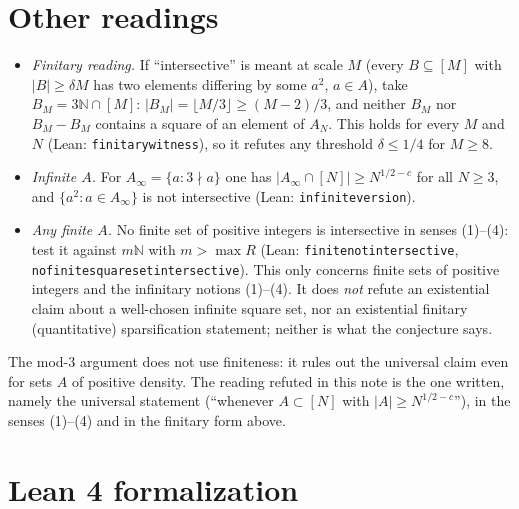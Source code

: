 \documentclass[11pt]{article}
\theoremstyle{definition}
\theoremstyle{remark}
\renewcommand{\_}{\oldus\allowbreak}
\newcommand{\N}{\mathbb{N}}
\begin{document}
\section{Other readings}

\begin{itemize}
  \item \emph{Finitary reading.} If ``intersective'' is meant at scale $M$ (every $B\subseteq[M]$ with
        $|B|\ge\delta M$ has two elements differing by some $a^2$, $a\in A$), take $B_M=3\N\cap[M]$:
        $|B_M|=\lfloor M/3\rfloor\ge(M-2)/3$, and neither $B_M$ nor $B_M-B_M$ contains a square of an element
        of $A_N$. This holds for every $M$ and $N$ (Lean: \texttt{finitary\_witness}), so it refutes any
        threshold $\delta\le1/4$ for $M\ge8$.
  \item \emph{Infinite $A$.} For $A_\infty=\{a:3\nmid a\}$ one has $|A_\infty\cap[N]|\ge N^{1/2-c}$ for all
        $N\ge3$, and $\{a^2:a\in A_\infty\}$ is not intersective (Lean: \texttt{infinite\_version}).
  \item \emph{Any finite $A$.} No finite set of positive integers is intersective in senses (1)--(4): test
        it against $m\N$ with $m>\max R$ (Lean: \texttt{finite\_not\_intersective},
        \texttt{no\_finite\_square\_set\_intersective}). This only concerns finite sets of positive
        integers and the infinitary notions (1)--(4). It does \emph{not} refute an existential claim about
        a well-chosen infinite square set, nor an existential finitary (quantitative) sparsification
        statement; neither is what the conjecture says.
\end{itemize}
The mod-$3$ argument does not use finiteness: it rules out the universal claim even for sets $A$ of
positive density. The reading refuted in this note is the one written, namely the universal statement
(``whenever $A\subset[N]$ with $|A|\ge N^{1/2-c}$''), in the senses (1)--(4) and in the finitary form
above.

\section{Lean 4 formalization}
\end{document}
